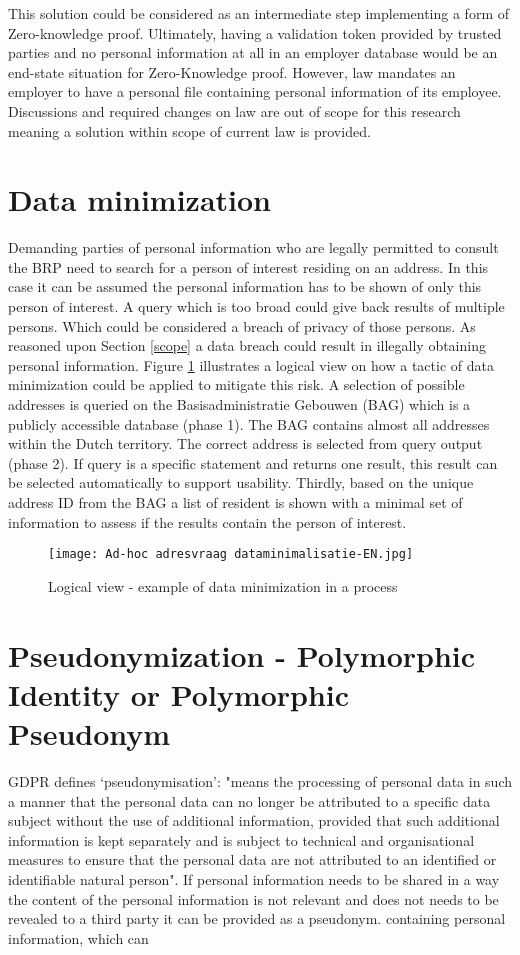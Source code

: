 This solution could be considered as an intermediate step implementing a form of Zero-knowledge proof. Ultimately, having a validation token provided by trusted parties and no personal information at all in an employer database would be an end-state situation for Zero-Knowledge proof. However, law mandates an employer to have a personal file containing personal information of its employee. Discussions and required changes on law are out of scope for this research meaning a solution within scope of current law is provided.
\clearpage

\section{Data minimization}
Demanding parties of personal information who are legally permitted to consult the BRP need to search for a person of interest residing on an address. In this case it can be assumed the personal information has to be shown of only this person of interest. A query which is too broad could give back results of multiple persons. Which could be considered a breach of privacy of those persons. As reasoned upon Section \ref{scope} a data breach could result in illegally obtaining personal information. Figure \ref{fig:Adhoc} illustrates a logical view on how a tactic of data minimization could be applied to mitigate this risk. A selection of possible addresses is queried on the Basisadministratie Gebouwen (BAG) \cite{BAG} which is a publicly accessible database (phase 1). The BAG contains almost all addresses within the Dutch territory. The correct address is selected from query output (phase 2). If query is a specific statement and returns one result, this result can be selected automatically to support usability. Thirdly, based on the unique address ID from the BAG a list of resident is shown with a minimal set of information to assess if the results contain the person of interest.    
\graphicspath{ {./images/} }
\begin{figure}
\centering
\label{fig:Adhoc}
\texttt{[image: Ad-hoc adresvraag dataminimalisatie-EN.jpg]}\\
\caption{Logical view - example of data minimization in a process}
\end{figure}

\section{Pseudonymization - Polymorphic Identity or Polymorphic Pseudonym}
GDPR \cite{GDPR} defines ‘pseudonymisation’: "means the processing of personal data in such a manner that the personal data can no longer be attributed to a specific data subject without the use of additional information, provided that such additional information is kept separately and is subject to technical and organisational measures to ensure that the personal data are not attributed to an identified or identifiable natural person". If personal information needs to be shared in a way the content of the personal information is not relevant and does not needs to be revealed to a third party it can be provided as a pseudonym.   containing personal information, which can  

